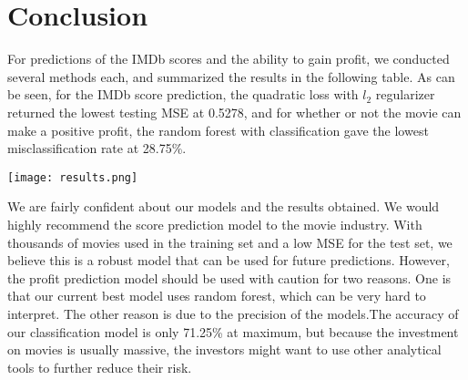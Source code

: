 \documentclass[12pt]{article}
\begin{document}
\section{Conclusion}
For predictions of the IMDb scores and the ability to gain profit, we conducted several methods each, and summarized the results in the following table. As can be seen, for the IMDb score prediction, the quadratic loss with $l_{2}$ regularizer returned the lowest testing MSE at 0.5278, and for whether or not the movie can make a positive profit, the random forest with classification gave the lowest misclassification rate at 28.75\%. 
\begin{center}
\texttt{[image: results.png]}\\
\end{center}
\par We are fairly confident about our models and the results obtained. We would highly recommend the score prediction model to the movie industry. With thousands of movies used in the training set and a low MSE for the test set, we believe this is a robust model that can be used for future predictions.  However, the profit prediction model should be used with caution for two reasons. One is that our current best model uses random forest, which can be very hard to interpret. The other reason is due to the precision of the models.The accuracy of our classification model is only 71.25\% at maximum, but because the investment on movies is usually massive, the investors might want to use other analytical tools to further reduce their risk. 
\end{document}
